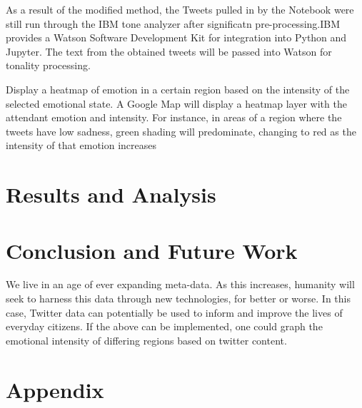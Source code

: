\documentclass[12pt, oneside]{article}
\begin{document}
 As a result of the modified method, the Tweets pulled in by the Notebook were
 still run through the IBM tone analyzer after significatn pre-processing.IBM provides a Watson Software
 Development Kit for integration into Python and Jupyter. The text from the
 obtained tweets will be passed into Watson for tonality processing.

 Display a heatmap of emotion in a certain region based on the intensity
 of the selected emotional state. A Google
 Map will display a heatmap layer with the attendant emotion and intensity. For
 instance, in areas of a region where the tweets have low sadness, green shading
 will predominate, changing to red as the intensity of that emotion increases


\section{Results and Analysis}


\section{Conclusion and Future Work}
We live in an age of ever expanding meta-data. As this increases, humanity will
seek to harness this data through new technologies, for better or worse. In
this case, Twitter data can potentially be used to inform and improve the lives
of everyday citizens. If the above can be implemented, one could graph
the emotional intensity of differing regions based on twitter content.

\newpage{}


%


\newpage{}
\section{Appendix}
\end{document}
